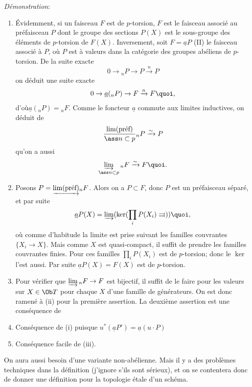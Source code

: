 \documentclass[10pt]{../fichiers-configuration-latex/smfart}
\begin{document}
\noindent
\emph{Démonstration}:
\begin{enumerate}
\renewcommand{\theenumi}{\roman{enumi}}
\renewcommand{\labelenumi}{(\theenumi)}
\item Évidemment, si un faisceau $F$ est de $p$-torsion, $F$ est le
  faisceau associé au préfaisceau $P$ dont le groupe des sections
  $P(X)$ est le sous-groupe des éléments de $p$-torsion de
  $F(X)$. Inversement, soit $F=\underline{a}P$ (II) le faisceau associé à $P$,
  où $P$ est à valeurs dans la catégorie des groupes abéliens de
  $p$-torsion. De la suite exacte
$$
0\rightarrow {}_nP \rightarrow P\xrightarrow{n}P
$$
on déduit une suite exacte
$$
0\rightarrow \underline{a}({}_nP)\rightarrow F\xrightarrow{n}F{\quoi},
$$
d'où\pageoriginale $\underline{a}({}_nP)={}_nF$. Comme le foncteur $\underline{a}$
commute aux limites inductives, on déduit de
$$
\frac{\lim(\text{\rm préf})}{\ass n\subset p}{}_nP\xrightarrow{\sim}P
$$
qu'on a aussi
$$
\varinjlim_{\ass n\subset p} {}_nF\xrightarrow{\sim}F{\quoi}.
$$

\item Posons $P=\underrightarrow{\lim(\text{\rm préf})}{}_n F$. Alors on a
  $P\subset F$, donc $P$ est un préfaisceau séparé, et par suite
$$
\underline{a}P(X)=\varinjlim (\ker(\prod_i P(X_i)\rightrightarrows)){\quoi},
$$
où comme d'habitude la limite est prise suivant les familles
couvrantes $\{X_i\rightarrow X\}$. Mais comme $X$ est quasi-compact,
il suffit de prendre les familles couvrantes finies. Pour ces familles
$\prod_iP(X_i)$ est de $p$-torsion; donc le $\ker$ l'est aussi. Par
suite $\underline{a}P(X)=F(X)$ est de $p$-torsion.

\item Pour vérifier que $\varinjlim {}_nF\rightarrow F$ est bijectif,
  il suffit de le faire pour les valeurs sur $X\in \Ob T$ pour chaque
  $X$ d'une famille de générateurs. On est donc ramené à (ii) pour la
  première assertion. La deuxième assertion est une conséquence de

\item Conséquence de (i) puisque $u^{\ast}(\underline{a}P')=\underline{a}(u\cdot P)$

\item Conséquence facile de (iii).
\end{enumerate}

On aura aussi besoin d'une variante non-abélienne. Mais il y a des
problèmes techniques dans la définition (j'ignore s'ils sont sérieux),
et on se contentera donc de donner une définition pour la topologie
étale d'un schéma.
\end{document}
